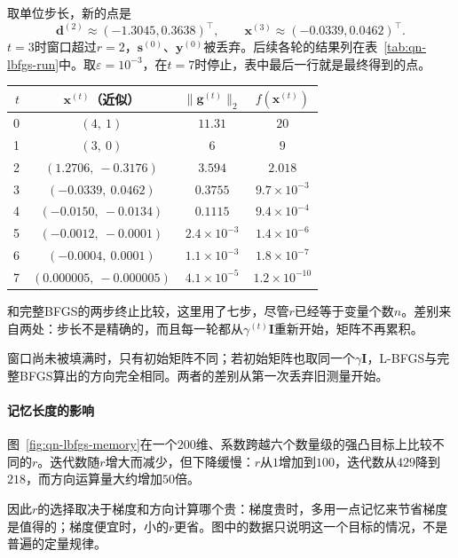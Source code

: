 取单位步长，新的点是
\[
 \bm{d}^{(2)}\approx(-1.3045,0.3638)^\top,\qquad\bm{x}^{(3)}\approx(-0.0339,0.0462)^\top.
\]
$t=3$时窗口超过$r=2$，$\bm{s}^{(0)}$、$\bm{y}^{(0)}$被丢弃。后续各轮的结果列在表~\ref{tab:qn-lbfgs-run}中。取$\varepsilon=10^{-3}$，在$t=7$时停止，表中最后一行就是最终得到的点。

\begin{BookInlineTable}
  \centering
  \begin{tabular}{rccc}
    \toprule
    $t$ & $\bm{x}^{(t)}$（近似） & $\lVert\bm{g}^{(t)}\rVert_2$ & $f(\bm{x}^{(t)})$\\
    \midrule
    0 & $(4,\ 1)$ & $11.31$ & $20$\\
    1 & $(3,\ 0)$ & $6$ & $9$\\
    2 & $(1.2706,\ -0.3176)$ & $3.594$ & $2.018$\\
    3 & $(-0.0339,\ 0.0462)$ & $0.3755$ & $9.7\times10^{-3}$\\
    4 & $(-0.0150,\ -0.0134)$ & $0.1115$ & $9.4\times10^{-4}$\\
    5 & $(-0.0012,\ -0.0001)$ & $2.4\times10^{-3}$ & $1.4\times10^{-6}$\\
    6 & $(-0.0004,\ 0.0001)$ & $1.1\times10^{-3}$ & $1.8\times10^{-7}$\\
    7 & $(0.000005,\ -0.000005)$ & $4.1\times10^{-5}$ & $1.2\times10^{-10}$\\
    \bottomrule
  \end{tabular}
  \caption{贯穿例上$r=2$的L-BFGS各轮结果，$\alpha^{(0)}=1/8$，其余各轮$\alpha^{(t)}=1$。}
  \label{tab:qn-lbfgs-run}
\end{BookInlineTable}

和完整BFGS的两步终止比较，这里用了七步，尽管$r$已经等于变量个数$n$。差别来自两处：步长不是精确的，而且每一轮都从$\gamma^{(t)}\bm{I}$重新开始，矩阵不再累积。

窗口尚未被填满时，只有初始矩阵不同；若初始矩阵也取同一个$\gamma\bm{I}$，L-BFGS与完整BFGS算出的方向完全相同。两者的差别从第一次丢弃旧测量开始。

\paragraph{记忆长度的影响}
图~\ref{fig:qn-lbfgs-memory}在一个$200$维、系数跨越六个数量级的强凸目标上比较不同的$r$。迭代数随$r$增大而减少，但下降缓慢：$r$从$1$增加到$100$，迭代数从$429$降到$218$，而方向运算量大约增加$50$倍。

因此$r$的选择取决于梯度和方向计算哪个贵：梯度贵时，多用一点记忆来节省梯度是值得的；梯度便宜时，小的$r$更省。图中的数据只说明这一个目标的情况，不是普遍的定量规律。

